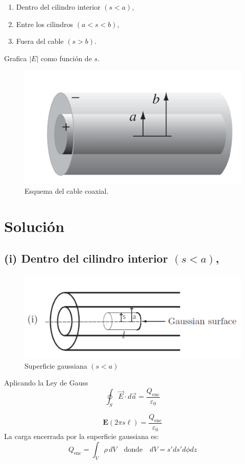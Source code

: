 \documentclass[12pt]{article}
\begin{document}
\begin{enumerate}[label=(\roman*)]
    \item Dentro del cilindro interior \((s < a)\),
    \item Entre los cilindros \((a < s < b)\),
    \item Fuera del cable \((s > b)\).
\end{enumerate}
Grafica \( |E| \) como función de \( s \).

\begin{figure}[ht]
    \centering
    \includegraphics[width=0.5\linewidth]{imagenes/5_IMG.png}
    \caption{Esquema del cable coaxial.}
    \label{fig:figura226}
\end{figure}

\section*{Solución}

\subsection*{(i) Dentro del cilindro interior \((s < a)\),}

\begin{figure}[ht]
    \centering
    \includegraphics[width=0.75\linewidth]{imagenes/(i).png}
    \caption{Superficie gaussiana \((s < a)\)}
    \label{fig:26_1}
\end{figure}

Aplicando la Ley de Gauss
\[
\oint_S \vec{E} \cdot d\vec{a} = \frac{Q_{\text{enc}}}{\varepsilon_0}
\]

\[
\textbf{E}(2\pi s \ell) = \frac{Q_{\text{enc}}}{\varepsilon_0}
\]
La carga encerrada por la superficie gaussiana es:
\[
Q_{\text{enc}} = \int_V \rho \, dV \quad \text{donde} \quad dV = s'  ds'  d\phi  dz
\]
\end{document}
